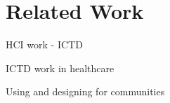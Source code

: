 \section{Related Work}

\begin{comment}
There are two, or three ways to do this. The first is to not do a RW section at all. In this case, you let the data/analysis connect with prior work as you go along. It would be nice if this could be sufficient but most often it is not. Further, people expect a section on prior work so you make it easier for reviewers to understand which body of work you are drawing on and extending.
 And yes, always draw on and extend. You want to contribute to a body of knowledge that already exists, because together as academics, that is our goal. However, you also want to extend that body of knowledge (otherwise why write this paper?). 
The second way to do this is to break RW down into subsections that are like circles in a venn diagram. Your research falls into the intersection of those circles. They may or may not intersect at multiple points. The important thing is to cover every paper that has a leaning/focus similar to yours. So you could do -- “Our paper builds on XYZ work. Here’s X and here’s how we extend it. Here’s Y and …”
The third (and slightly more preferable way, according to me) is to make the related work section flow instead of have it broken down into these discrete sections like I just mentioned. Tell it like a story, not like a list of papers. Make it seem thoughtful and nuanced, instead of a “1, 2, 3” listing. 
You can look at the Mobile Phones for Maternal Health in Rural India paper that I wrote for CHI 2015 as an example. It is by no means the best way to do this, but it did not raise any eyebrows in the review process, at least. One subsection (or 2-3 paragraphs) could be dedicated just to the theoretical lens, if you are using one.
\end{comment}

\textcolor{red}{}

HCI work - ICTD

ICTD work in healthcare

Using and designing for communities